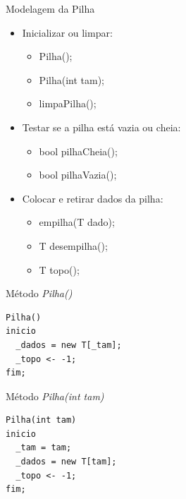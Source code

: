 \documentclass[12pt,table,xcolor={dvipsnames}]{beamer}
\begin{document}
\begin{frame}[fragile]{Modelagem da Pilha}

\begin{itemize}
\item Inicializar ou limpar:
\begin{itemize}
\item Pilha();
\item Pilha(int tam);
\item limpaPilha();
\end{itemize}
\item Testar se a pilha está vazia ou cheia:
\begin{itemize}
\item bool pilhaCheia();
\item bool pilhaVazia();
\end{itemize}
\item Colocar e retirar dados da pilha:
\begin{itemize}
\item empilha(T dado);
\item T desempilha();
\item T topo();
\end{itemize}
\end{itemize}
\end{frame}

\begin{frame}[fragile]{Método \textit{Pilha()}}
\begin{lstlisting}
Pilha()
inicio
  _dados = new T[_tam];
  _topo <- -1;
fim;
\end{lstlisting}
\end{frame}

\begin{frame}[fragile]{Método \textit{Pilha(int tam)}}
\begin{lstlisting}
Pilha(int tam)
inicio
  _tam = tam;
  _dados = new T[tam];
  _topo <- -1;
fim;
\end{lstlisting}
\end{frame}
\end{document}
